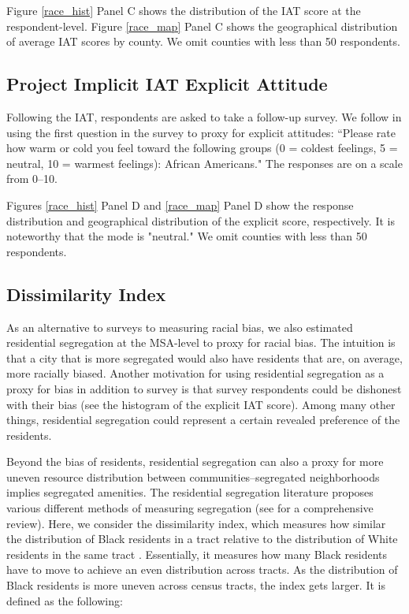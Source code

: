 \documentclass[11pt]{article}
\begin{document}
Figure \ref{race_hist} Panel C shows the distribution of the IAT score at the respondent-level. Figure \ref{race_map} Panel C shows the geographical distribution of average IAT scores by county. We omit counties with less than 50 respondents. 

\subsection{Project Implicit IAT Explicit Attitude}

Following the IAT, respondents are asked to take a follow-up survey. We follow \cite{bursztyn2021immigrant} in using the first question in the survey to proxy for explicit attitudes:  ``Please rate how warm or cold you feel toward the following groups (0 = coldest feelings, 5 = neutral, 10 = warmest feelings): African Americans." The responses are on a scale from 0--10.

Figures \ref{race_hist} Panel D and \ref{race_map} Panel D show the response distribution and geographical distribution of the explicit score, respectively. It is noteworthy that the mode is "neutral." We omit counties with less than 50 respondents.

\subsection{Dissimilarity Index}

As an alternative to surveys to measuring racial bias, we also estimated residential segregation at the MSA-level to proxy for racial bias. The intuition is that a city that is more segregated would also have residents that are, on average, more racially biased. Another motivation for using residential segregation as a proxy for bias in addition to survey is that survey respondents could be dishonest with their bias (see the histogram of the explicit IAT score). Among many other things, residential segregation could represent a certain revealed preference of the residents.

Beyond the bias of residents, residential segregation can also a proxy for more uneven resource distribution between communities--segregated neighborhoods implies segregated amenities. The residential segregation literature proposes various different methods of measuring segregation (see \cite{massey1988dimensions} for a comprehensive review).  Here, we consider the dissimilarity index, which measures how similar the distribution of Black residents in a tract relative to the distribution of White residents in the same tract \citep{massey1988dimensions}. Essentially, it measures how many Black residents have to move to achieve an even distribution across tracts. As the distribution of Black residents is more uneven across census tracts, the index gets larger. It is defined as the following:
\end{document}
